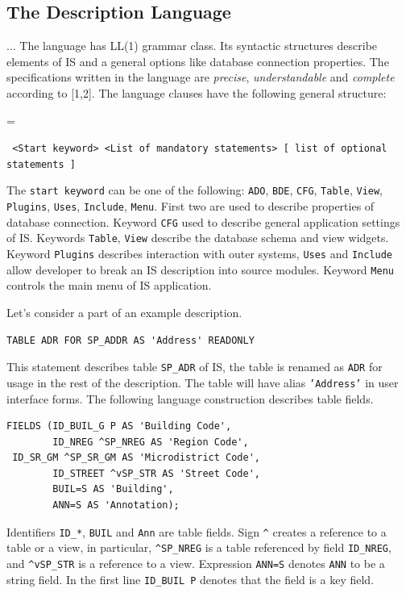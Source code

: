 \documentclass[conference]{IEEEtran}
\newenvironment{asdcode}{\hangindent=\parindent\hangafter=1\par\noindent\small\tt}{}
\begin{document}
\subsection{The Description Language}

... The language has LL(1) grammar class.  Its syntactic structures describe elements of IS and a general options like database connection properties.  The specifications written in the language are \emph{precise}, \emph{understandable} and \emph{complete} according to [1,2].  The language clauses have the following general structure:

\begin{asdcode}%
<Start keyword> <List of mandatory statements> [~list of optional statements~]
\end{asdcode}

The \texttt{start keyword} can be one of the following: \texttt{ADO}, \texttt{BDE}, \texttt{CFG}, \texttt{Table}, \texttt{View}, \texttt{Plugins}, \texttt{Uses}, \texttt{Include}, \texttt{Menu}.  First two are used to describe properties of database connection.  Keyword \texttt{CFG} used to describe general application settings of IS.  Keywords \texttt{Table}, \texttt{View} describe the database schema and view widgets.  Keyword \texttt{Plugins} describes interaction with outer systems, \texttt{Uses} and \texttt{Include} allow developer to break an IS description into source modules.  Keyword \texttt{Menu} controls the main menu of IS application.

Let's consider a part of an example description.

\begin{lstlisting}
TABLE ADR FOR SP_ADDR AS 'Address' READONLY
\end{lstlisting}

This statement describes table \texttt{SP\_ADR} of IS, the table is renamed as \texttt{ADR} for usage in the rest of the description. The table will have alias \texttt{'Address'} in user interface forms.  The following language construction describes table fields.

\begin{lstlisting}
FIELDS (ID_BUIL_G P AS 'Building Code',
        ID_NREG ^SP_NREG AS 'Region Code',
 ID_SR_GM ^SP_SR_GM AS 'Microdistrict Code',
        ID_STREET ^vSP_STR AS 'Street Code',
        BUIL=S AS 'Building',
        ANN=S AS 'Annotation);
\end{lstlisting}

Identifiers \texttt{ID\_*}, \texttt{BUIL} and \texttt{Ann} are table fields.  Sign \texttt{\^} creates a reference to a table or a view, in particular, \texttt{\^{}SP\_NREG} is a table referenced by field \texttt{ID\_NREG}, and \texttt{\^{}vSP\_STR} is a reference to a view.  Expression \texttt{ANN=S} denotes \texttt{ANN} to be a string field.  In the first line \texttt{ID\_BUIL P} denotes that the field is a key field.
\end{document}
